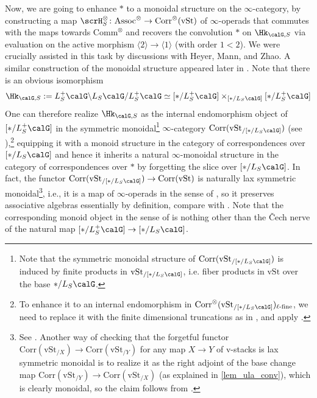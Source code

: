 \documentclass[10pt, reqno]{amsart}
\theoremstyle{plain}
\theoremstyle{definition}
\numberwithin{equation}{section}
\begin{document}
	Now, we are going to enhance $\ast$ to a monoidal structure on the $\infty$-category, by constructing a map $\scrH^\otimes_S \colon \mathrm{Assoc}^\otimes \to \mathrm{Corr}^{\otimes}(\mathrm{vSt})$ of $\infty$-operads that commutes with the maps towards $\mathrm{Comm}^\otimes$ and recovers the convolution $\ast$ on $\Hk_{\calG,S}$ via evaluation on the active morphism $\langle 2 \rangle \to \langle 1 \rangle$ (with order $1<2$). We were crucially assisted in this task by discussions with Heyer, Mann, and Zhao. A similar construction of the monoidal structure appeared later in \cite[Example 8.7 and Corollary 8.11]{Zhu25}. Note that there is an obvious isomorphism
	\begin{equation}
		\Hk_{\calG,S}:= L_S^+\calG \backslash L_S\calG /L_S^+\calG \simeq [*/L_S^+\calG] \times_{[*/L_S\calG]} [*/L^+_S\calG]
	\end{equation}
	One can therefore realize $\Hk_{\calG,S}$ as the internal endomorphism object of $[*/L_S^+\calG] $ in the symmetric monoidal\footnote{Note that the symmetric monoidal structure of  $\mathrm{Corr}(\mathrm{vSt}_{/[*/L_S\calG]})$ is induced by finite products in $\mathrm{vSt}_{/[*/L_S\calG]}$, i.e. fiber products in $\mathrm{vSt}$ over the base $*/L_S\calG$.}
	$\infty$-category $\mathrm{Corr}(\mathrm{vSt}_{/[*/L_S\calG]})$ (see \cite[Proposition 2.4.1]{HM24}),\footnote{To enhance it to an internal endomorphism in $\mathrm{Corr}^\otimes(\mathrm{vSt}_{/[*/L_S\calG]})_{\ell\text{-}\mathrm{fine}}$, 
		we need to replace it with the finite dimensional truncations as in \cite[Definition 5.1.2, Subsection 5.1.7]{XZ17}, and apply \cite[Proposition 2.3.9]{HM24}.
	}
	equipping it with a monoid structure in the category of correspondences over $[*/L_S\calG]$ and hence it inherits a natural $\infty$-monoidal structure in the category of correspondences over $*$ by forgetting the slice over $[*/L_S\calG]$.
	In fact, the functor $\mathrm{Corr}(\mathrm{vSt}_{/[*/L_S\calG]})\to \mathrm{Corr}(\mathrm{vSt})$ is naturally lax symmetric monoidal\footnote{See \cite[Definition 4.1.3.(b)]{HM24}. Another way of checking that the forgetful functor $\mathrm{Corr}(\mathrm{vSt}_{/X})\to \mathrm{Corr}(\mathrm{vSt}_{/Y})$ for any map $X\to Y$ of v-stacks is lax symmetric monoidal is to realize it as the right adjoint of the base change map $\mathrm{Corr}(\mathrm{vSt}_{/Y})\to \mathrm{Corr}(\mathrm{vSt}_{/X})$ (as explained in \ref{lem_ula_conv}), which is clearly monoidal, so the claim follows from \cite[Corollary 7.3.2.7]{Lur17}.
	}, i.e., it is a map of $\infty$-operads in the sense of \cite[Definition 2.1.2.7]{Lur17}, so it preserves associative algebras essentially by definition, compare with \cite[Definition 2.1.3.1]{Lur17}. Note that the corresponding monoid object in the sense of \cite[Definition 4.1.2.5]{Lur17} is nothing other than the \v{C}ech nerve of the natural map $[*/L_S^+\calG] \to [*/L_S\calG]$.
	
\end{document}
